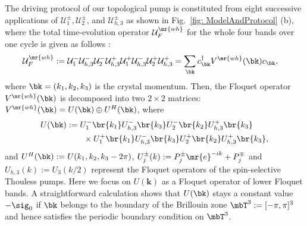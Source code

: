 \documentclass[
floatfix,
pra,
twocolumn,
reprint,
amsmath,amssymb,
aps,
footnote,
]{revtex4}
\begin{document}
The driving protocol of our topological pump is constituted from eight successive applications of $\mathcal{U}_1^\pm, \mathcal{U}_2^\pm$, and $\mathcal{U}_{h, 3}^\pm$ as shown in Fig.~\ref{fig: ModelAndProtocol} (b), where the total time-evolution operator $\mathcal{U}_F^{\mr{wh}}$ for the whole four bands over one cycle is given as follows \cite{3d_winding, experiment}:
\begin{align}
	\mathcal{U}_F^{\mr{wh}} &:=
\mathcal{U}_1^- \mathcal{U}_{h,3}^- \mathcal{U}_2^- \mathcal{U}_{h,3}^+
\mathcal{U}_1^+ \mathcal{U}_{h,3}^- \mathcal{U}_2^+ \mathcal{U}_{h,3}^+ =
	\sum_{\bk} c_{\bk}^\dagger V^{\mr{wh}}(\bk) c_{\bk}
	, \label{eq: whole protocol}
	\end{align}
where $\bk = (k_1, k_2, k_3)$ is the crystal momentum.
Then, the Floquet operator $V^{\mr{wh}}(\bk)$ is decomposed into two $2 \times 2$ matrices: $V^{\mr{wh}}(\bk) = U(\bk) \oplus U^H(\bk)$, where
\begin{align}
	U(\bk) &:=
	U_1^-\br{k_1}U_{h,3}^-\br{k_3}U_2^-\br{k_2}U_{h,3}^+\br{k_3}
	\nonumber \\ & \quad\quad \times
	U_1^+\br{k_1}U_{h,3}^-\br{k_3}U_2^+\br{k_2}U_{h,3}^+\br{k_3}
	, \label{eq: strobo0}
\end{align}
and $U^H(\bk):= U(k_1, k_2, k_3-2\pi)$, $U_{j}^\pm(k) := P_{j}^\pm \mr{e}^{-ik} + P_{j}^\mp$ and $U_{h,3}(k) := U_3(k/2)$ represent the Floquet operators of the spin-selective Thouless pumps.
Here we focus on $U(\bm{k})$ as a Floquet operator of lower Floquet bands.
A straightforward calculation shows that $U(\bk)$ stays a constant value $-\sig_0$ if $\bk$ belongs to the boundary of the Brillouin zone $\mbT^3 := [-\pi,\pi]^3$ and hence satisfies the periodic boundary condition on $\mbT^3$.
\end{document}
